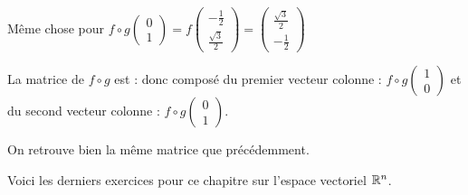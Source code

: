 \change
Même chose pour
$f\circ g \begin{pmatrix} 0 \\ 1 \end{pmatrix}
= f \begin{pmatrix} - \frac12 \\ \frac{\sqrt{3}}{2}  \end{pmatrix}
= \begin{pmatrix} \frac{\sqrt{3}}{2} \\ -\frac12  \end{pmatrix}$

\change
La matrice de $f \circ g$ est :
donc composé du premier vecteur colonne :
$f\circ g \begin{pmatrix} 1 \\ 0 \end{pmatrix}$ et du second vecteur colonne :
$f\circ g \begin{pmatrix} 0 \\ 1 \end{pmatrix}$.

On retrouve bien la même matrice que précédemment.



\diapo

Voici les derniers exercices pour ce chapitre sur l'espace vectoriel $\mathbb{R}^n$.



